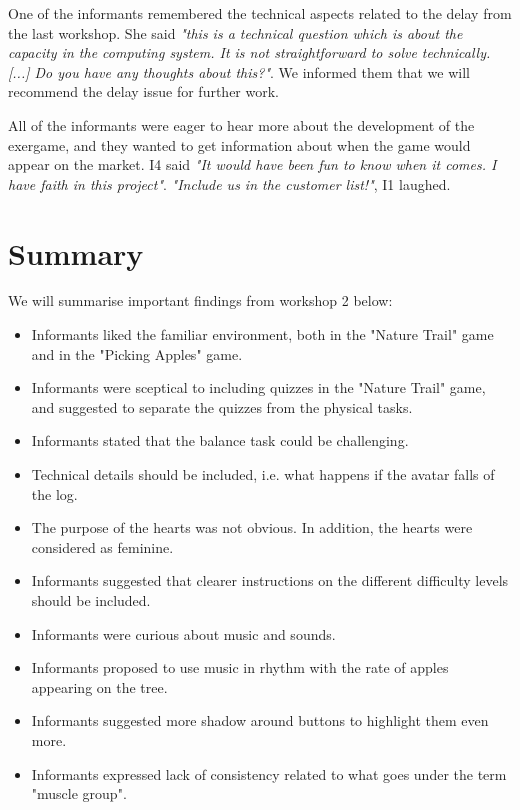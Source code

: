 One of the informants remembered the technical aspects related to the delay from the last workshop. She said \emph{"this is a technical question which is about the capacity in the computing system. It is not straightforward to solve technically. [...] Do you have any thoughts about this?"}. We informed them that we will recommend the delay issue for further work.

All of the informants were eager to hear more about the development of the exergame, and they wanted to get information about when the game would appear on the market. I4 said \emph{"It would have been fun to know when it comes. I have faith in this project"}. \emph{"Include us in the customer list!"}, I1 laughed.

\section{Summary}

We will summarise important findings from workshop 2 below:

\begin{itemize}
\item Informants liked the familiar environment, both in the "Nature Trail" game and in the "Picking Apples" game.
\item Informants were sceptical to including quizzes in the "Nature Trail" game, and suggested to separate the quizzes from the physical tasks.
\item Informants stated that the balance task could be challenging.
\item Technical details should be included, i.e. what happens if the avatar falls of the log.
\item The purpose of the hearts was not obvious. In addition, the hearts were considered as feminine.
\item Informants suggested that clearer instructions on the different difficulty levels should be included.
\item Informants were curious about music and sounds. 
\item Informants proposed to use music in rhythm with the rate of apples appearing on the tree. 
\item Informants suggested more shadow around buttons to highlight them even more.
\item Informants expressed lack of consistency related to what goes under the term "muscle group".

\end{itemize}



